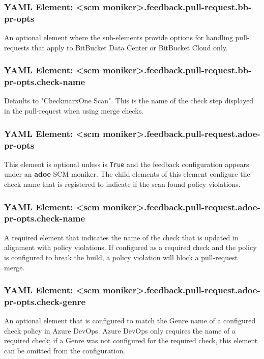 \subsubsection{YAML Element: <scm moniker>.feedback.pull-request.bb-pr-opts}\label{sec:yaml-pull-request-bb-pr-opts}
An optional element where the sub-elements provide options for handling pull-requests that apply to
BitBucket Data Center or BitBucket Cloud only.

\subsubsection{YAML Element: <scm moniker>.feedback.pull-request.bb-pr-opts.check-name}\label{sec:yaml-pull-request-bb-pr-opts-check-name}
Defaults to "CheckmarxOne Scan".  This is the name of the check step displayed in the pull-request
when using merge checks.

\subsubsection{YAML Element: <scm moniker>.feedback.pull-request.adoe-pr-opts}\label{sec:yaml-pull-request-adoe-pr-opts}
This element is optional unless  is \texttt{True}
and the feedback configuration appears under an \textbf{adoe} SCM moniker.  The child elements of this
element configure the check name that is registered to indicate if the scan found \cxone policy violations.

\subsubsection{YAML Element: <scm moniker>.feedback.pull-request.adoe-pr-opts.check-name}\label{sec:yaml-pull-request-adoe-pr-opts-check-name}
A required element that indicates the name of the check that is updated in alignment
with \cxone policy violations.  If configured as a required check and the \cxone policy is configured
to break the build, a policy violation will block a pull-request merge.

\subsubsection{YAML Element: <scm moniker>.feedback.pull-request.adoe-pr-opts.check-genre}\label{sec:yaml-pull-request-adoe-pr-opts-check-genre}
An optional element that is configured to match the Genre name of a configured check policy in Azure DevOps.
Azure DevOps only requires the name of a required check; if a Genre was not configured for the required check,
this element can be omitted from the configuration.

